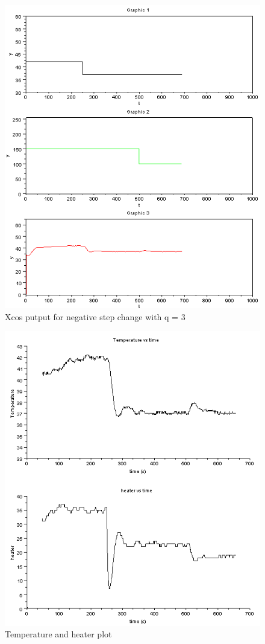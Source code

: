 \begin{figure}[H]
\centering
  \includegraphics[width=0.8\linewidth]{mpc/4_2.PNG}
  \caption{Xcos putput for negative step change with q = 3}
\end{figure}
\begin{figure}[H]
\centering
  \includegraphics[width=0.8\linewidth]{mpc/4_2_heater_final.png}
  \caption{Temperature and heater plot}
\end{figure}



